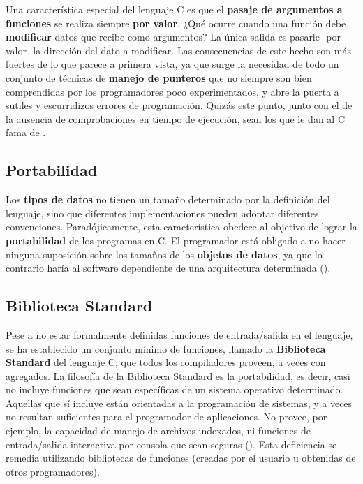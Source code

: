 Una característica especial del lenguaje C es que el \textbf{pasaje de
argumentos a funciones} se realiza siempre \textbf{por valor}. ¿Qué ocurre
cuando una función debe \textbf{modificar} datos que recibe como
argumentos? La única salida es pasarle -por valor- la dirección del
dato a modificar. Las consecuencias de este hecho son más fuertes de
lo que parece a primera vista, ya que surge la necesidad de todo un
conjunto de técnicas de \textbf{manejo de punteros} que no siempre son bien
comprendidas por los programadores poco experimentados, y abre la
puerta a sutiles y escurridizos errores de programación. Quizás
este punto, junto con el de la ausencia de comprobaciones en tiempo de
ejecución, sean los que le dan al C fama de . 

\subsection{Portabilidad}
Los \textbf{tipos de datos} no tienen un tamaño determinado por la definición
del lenguaje, sino que diferentes implementaciones pueden adoptar
diferentes convenciones. Paradójicamente, esta característica
obedece al objetivo de lograr la \textbf{portabilidad} de los programas en C. El
programador está obligado a no hacer ninguna suposición sobre los
tamaños de los \textbf{objetos de datos}, ya que lo contrario haría al
software dependiente de una arquitectura determinada (). 



\subsection{Biblioteca Standard}
Pese a no estar formalmente definidas funciones de entrada/salida en el lenguaje, se ha establecido un conjunto mínimo de funciones,
llamado la \textbf{Biblioteca Standard} del lenguaje C, que todos los
compiladores proveen, a veces con agregados. La filosofía de la
Biblioteca Standard es la portabilidad, es decir, casi no incluye
funciones que sean específicas de un sistema operativo determinado.
Aquellas que sí incluye están orientadas a la programación de sistemas, y a
veces no resultan suficientes para el programador de aplicaciones. No
provee, por ejemplo, la capacidad de manejo de archivos indexados, ni
funciones de entrada/salida interactiva por consola que sean seguras
(). Esta deficiencia
se remedia utilizando bibliotecas de funciones  (creadas por el usuario u obtenidas de
otros programadores). 

